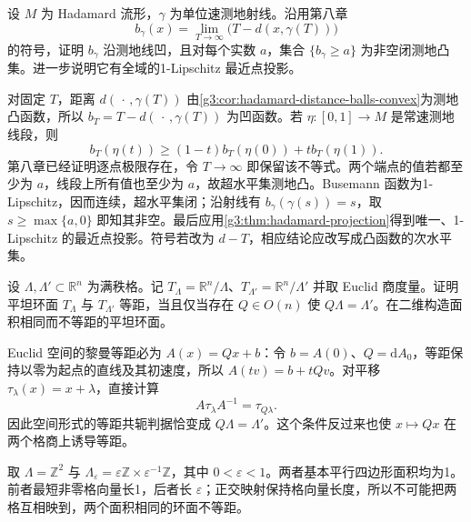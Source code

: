 \begin{exercise}\label{g3:ex:hadamard-busemann-concavity}
	设 \(M\) 为 Hadamard 流形，\(\gamma\) 为单位速测地射线。沿用第八章
	\[
		b_\gamma(x)=\lim_{T\to\infty}\bigl(T-d(x,\gamma(T))\bigr)
	\]
	的符号，证明 \(b_\gamma\) 沿测地线凹，且对每个实数 \(a\)，集合 \(\{b_\gamma\ge a\}\) 为非空闭测地凸集。进一步说明它有全域的1-Lipschitz 最近点投影。
\end{exercise}
\begin{solution}
	对固定 \(T\)，距离 \(d(\,\cdot\,,\gamma(T))\) 由\cref{g3:cor:hadamard-distance-balls-convex}为测地凸函数，所以 \(b_T=T-d(\,\cdot\,,\gamma(T))\) 为凹函数。若 \(\eta:[0,1]\to M\) 是常速测地线段，则
	\[
		b_T(\eta(t))\ge(1-t)b_T(\eta(0))+tb_T(\eta(1)).
	\]
	第八章已经证明逐点极限存在，令 \(T\to\infty\) 即保留该不等式。两个端点的值若都至少为 \(a\)，线段上所有值也至少为 \(a\)，故超水平集测地凸。Busemann 函数为1-Lipschitz，因而连续，超水平集闭；沿射线有 \(b_\gamma(\gamma(s))=s\)，取 \(s\ge\max\{a,0\}\) 即知其非空。最后应用\cref{g3:thm:hadamard-projection}得到唯一、1-Lipschitz 的最近点投影。符号若改为 \(d-T\)，相应结论应改写成凸函数的次水平集。
\end{solution}

\begin{exercise}\label{g3:ex:flat-tori-isometry-lattices}
	设 \(\Lambda,\Lambda'\subset\mathbb R^n\) 为满秩格。记 \(T_\Lambda=\mathbb R^n/\Lambda\)、\(T_{\Lambda'}=\mathbb R^n/\Lambda'\) 并取 Euclid 商度量。证明平坦环面 \(T_\Lambda\) 与 \(T_{\Lambda'}\) 等距，当且仅当存在 \(Q\in O(n)\) 使 \(Q\Lambda=\Lambda'\)。在二维构造面积相同而不等距的平坦环面。
\end{exercise}
\begin{solution}
	Euclid 空间的黎曼等距必为 \(A(x)=Qx+b\)：令 \(b=A(0)\)、\(Q=\mathrm dA_0\)，等距保持以零为起点的直线及其初速度，所以 \(A(tv)=b+tQv\)。对平移 \(\tau_\lambda(x)=x+\lambda\)，直接计算
	\[
		A\tau_\lambda A^{-1}=\tau_{Q\lambda}.
	\]
	因此空间形式的等距共轭判据恰变成 \(Q\Lambda=\Lambda'\)。这个条件反过来也使 \(x\mapsto Qx\) 在两个格商上诱导等距。

	取 \(\Lambda=\mathbb Z^2\) 与 \(\Lambda_\varepsilon=\varepsilon\mathbb Z\times\varepsilon^{-1}\mathbb Z\)，其中 \(0<\varepsilon<1\)。两者基本平行四边形面积均为1。前者最短非零格向量长1，后者长 \(\varepsilon\)；正交映射保持格向量长度，所以不可能把两格互相映到，两个面积相同的环面不等距。
\end{solution}

